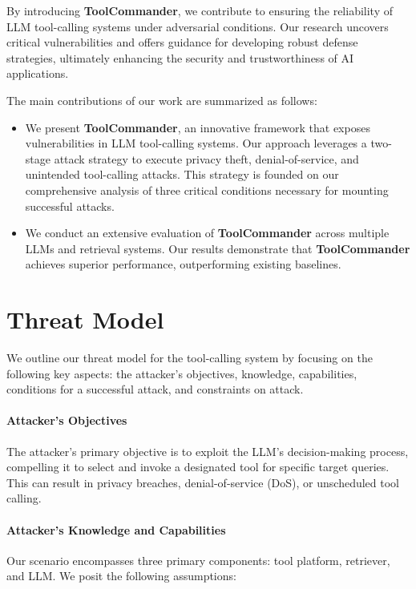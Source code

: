 By introducing \textbf{ToolCommander}, we contribute to ensuring the reliability of LLM tool-calling systems under adversarial conditions. Our research uncovers critical vulnerabilities and offers guidance for developing robust defense strategies, ultimately enhancing the security and trustworthiness of AI applications.

The main contributions of our work are summarized as follows:
\begin{itemize}
    \item We present \textbf{ToolCommander}, an innovative framework that exposes vulnerabilities in LLM tool-calling systems. Our approach leverages a two-stage attack strategy to execute privacy theft, denial-of-service, and unintended tool-calling attacks. This strategy is founded on our comprehensive analysis of three critical conditions necessary for mounting successful attacks.
    \item We conduct an extensive evaluation of \textbf{ToolCommander} across multiple LLMs and retrieval systems. Our results demonstrate that \textbf{ToolCommander} achieves superior performance, outperforming existing baselines. 
\end{itemize}

\section{Threat Model}
We outline our threat model for the tool-calling system by focusing on the following key aspects: the attacker's objectives, knowledge, capabilities, conditions for a successful attack, and constraints on attack.

\paragraph{Attacker's Objectives}
The attacker's primary objective is to exploit the LLM's decision-making process, compelling it to select and invoke a designated tool for specific target queries. This can result in privacy breaches, denial-of-service (DoS), or unscheduled tool calling.

\paragraph{Attacker's Knowledge and Capabilities}
Our scenario encompasses three primary components: tool platform, retriever, and LLM. We posit the following assumptions:


